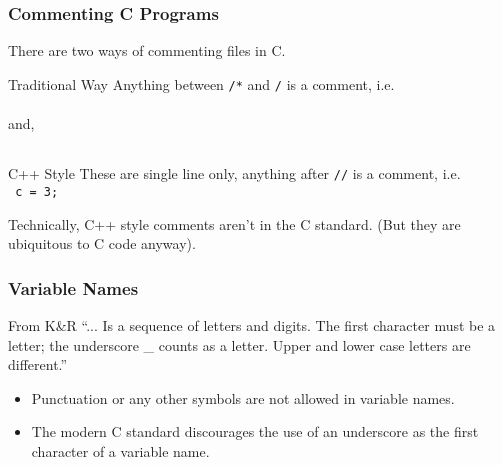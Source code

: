 \documentclass[smaller,table]{beamer} %
\begin{document}
\begin{frame}
\frametitle{Commenting C Programs}
There are two ways of commenting files in C.

\begin{block}{Traditional Way}
Anything between {\tt /*} and {\tt */} is a comment, i.e.\\
\\
and,\\
{\tt {} }\\
{\tt {}}
\end{block}

\begin{block}{C++ Style}
These are single line only, anything after {\tt //} is a comment, i.e.\\
{\tt {} c = 3; }
\end{block}

\begin{alertblock}{}
Technically, C++ style comments aren't in the C standard. (But they are
ubiquitous to C code anyway).
\end{alertblock}
\end{frame}

\begin{frame}
\frametitle{Variable Names}
\begin{block}{From K\&R}
``... Is a sequence of letters and digits. The first character must be a letter; the underscore \_ counts as a letter. Upper and lower case letters are different.''
\end{block}

\begin{itemize}
\item Punctuation or any other symbols are not allowed in variable names.
\item The modern C standard discourages the use of an underscore as the first character of a variable name.
\end{itemize}
\end{frame}
\end{document}
